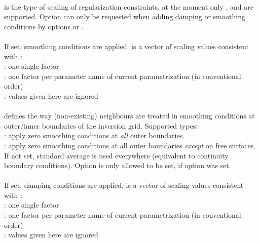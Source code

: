 \paragraph{}
 is the type of scaling of regularization constraints, at the moment only 
,  and  are supported. 
Option  can only be requested when adding damping or smoothing conditions by options 
 or .
\paragraph{}
If set, smoothing conditions are applied.  is a vector of scaling values consistent 
with :\\
: one single factor\\
: one factor per parameter name of current parametrization (in conventional order)\\
 : values given here are ignored
\paragraph{}
 defines the way (non-existing) neighbours are treated in smoothing conditions at outer/inner 
boundaries of the inversion grid. Supported types:\\
: apply zero smoothing conditions at \emph{all} outer boundaries.\\
: apply zero smoothing conditions at all outer boundaries \emph{except} on free surfaces. \\
If not set, standard average is used everywhere (equivalent to continuity boundary conditions).
Option  is only allowed to be set, if option  was set.
\paragraph{}
If set, damping conditions are applied.  is a vector of scaling values consistent 
with :\\
: one single factor\\
: one factor per parameter name of current parametrization (in conventional order)\\
 : values given here are ignored
